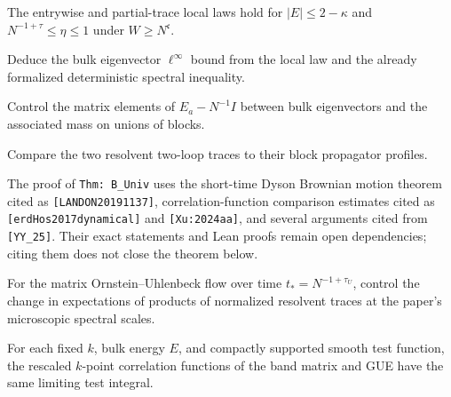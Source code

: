 \begin{theorem}\label{thm:local-law}
  The entrywise and partial-trace local laws hold for
  $|E|\le2-\kappa$ and $N^{-1+\tau}\le\eta\le1$ under $W\ge N^{\mathfrak c}$.
\end{theorem}

\begin{theorem}\label{thm:delocalization}
  Deduce the bulk eigenvector $\ell^\infty$ bound from the local law and the
  already formalized deterministic spectral inequality.
\end{theorem}

\begin{theorem}\label{thm:que}
  Control the matrix elements of $E_a-N^{-1}I$ between bulk eigenvectors and
  the associated mass on unions of blocks.
\end{theorem}

\begin{theorem}\label{thm:qdiff}
  Compare the two resolvent two-loop traces to their block propagator profiles.
\end{theorem}

\begin{remark}\label{rem:universality-inputs}
  The proof of \texttt{Thm: B\_Univ} uses the short-time Dyson Brownian motion
  theorem cited as \texttt{[LANDON20191137]}, correlation-function comparison
  estimates cited as \texttt{[erdHos2017dynamical]} and \texttt{[Xu:2024aa]},
  and several arguments cited from
  \texttt{[YY\_25]}.  Their exact statements and Lean proofs remain open
  dependencies; citing them does not close the theorem below.
\end{remark}

\begin{lemma}\label{lem:short-time-comparison}
  For the matrix Ornstein--Uhlenbeck flow over time
  $t_*=N^{-1+\tau_U}$, control the change in expectations of products of
  normalized resolvent traces at the paper's microscopic spectral scales.
\end{lemma}

\begin{theorem}\label{thm:bulk-univ}
  For each fixed $k$, bulk energy $E$, and compactly supported smooth test
  function, the rescaled $k$-point correlation functions of the band matrix
  and GUE have the same limiting test integral.
\end{theorem}
